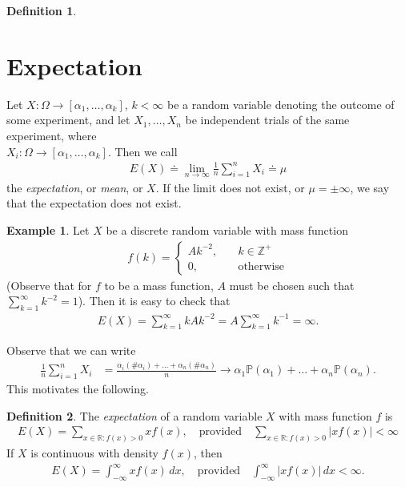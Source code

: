 \documentclass[12pt]{article}
\newcommand{\rr}{\mathbb{R}}
\newcommand{\zz}{\mathbb{Z}}
\newcommand{\prob}{\mathbb{P}}
\theoremstyle{plain}
\theoremstyle{definition}
\newtheorem*{definition}{Definition}
\newtheorem*{example}{Example}
\theoremstyle{remark}
\numberwithin{equation}{section}  %
\begin{document}
\begin{definition}
\section{Expectation}
Let $X: \Omega \to [\alpha_1, \ldots, \alpha_k]$, $k < \infty$ be a random
variable denoting the outcome of some experiment, and let $X_1, \ldots, X_n$ be independent trials
of the same experiment, where \\ $X_i:
\Omega \to [\alpha_1, \ldots, \alpha_k]$. Then we 
call
\begin{align*}
E(X) \doteq \lim_{n \to \infty} \frac{1}{n} \sum_{i =1}^n X_i \doteq \mu 
\end{align*}
the \emph{expectation}, or \emph{mean}, or $X$. If the limit does not exist,
or $\mu = \pm \infty$, we say that the expectation does not exist.
\end{definition}
\begin{example}
Let $X$ be a discrete random variable with mass function 
\begin{align*}
f(k) = \begin{cases}
Ak^{-2},  \quad &k\in \zz^{+} 
\\
0, \quad & \text{otherwise}
\end{cases}
\end{align*}
(Observe that for $f$ to be a mass function, $A$ must be chosen such that
$\sum_{k = 1}^{\infty} k^{-2} = 1$).
Then it is easy to check that
\begin{align*}
E(X) = \sum_{k=1}^{\infty} k Ak^{-2} = A \sum_{k=1}^{\infty} k^{-1} = \infty.
\end{align*}

\end{example}
Observe that we can write
\begin{align*}
\frac{1}{n} \sum_{i = 1}^n X_i
& = \frac{\alpha_i (\#\alpha_i) + \ldots +
\alpha_n (\#\alpha_n)}{n}
 \to \alpha_1 \prob(\alpha_1) + \ldots + \alpha_n \prob(\alpha_n).
\end{align*}
This motivates the following.
\begin{definition}
The \emph{expectation} of a random variable $X$ with mass function $f$ is
\begin{align*}
E(X) = \sum_{x \in \rr: f(x) > 0} x f(x), \quad \text{provided} \quad
\sum_{x \in \rr: f(x) > 0} |x
f(x) | <
\infty
\end{align*}
If $X$ is continuous with density $f(x)$, then
\begin{align*}
E(X) = \int_{-\infty}^{\infty} xf(x) \, dx, \quad \text{provided} \quad
\int_{-\infty}^{\infty} |xf(x)| \, dx < \infty.
\end{align*}
\end{definition}
\end{document}
